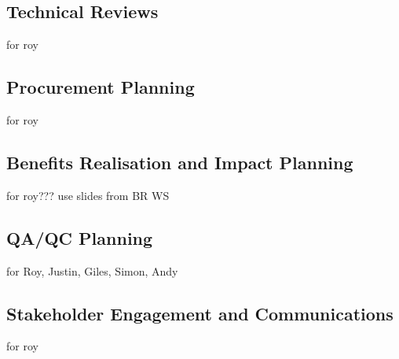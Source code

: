 \subsection{Technical Reviews}
for roy

\subsection{Procurement Planning}
for roy

\subsection{Benefits Realisation and Impact Planning}
for roy??? use slides from BR WS

\subsection{QA/QC Planning}
for Roy, Justin, Giles, Simon, Andy

\subsection{Stakeholder Engagement and Communications}
for roy